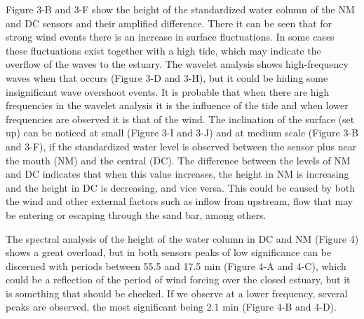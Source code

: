 \documentclass[tesis.tex]{subfiles}
\begin{document}
    
    Figure 3-B and 3-F show the height of the standardized water column of the NM and DC sensors and their amplified difference. There it can be seen that for strong wind events there is an increase in surface fluctuations. In some cases these fluctuations exist together with a high tide, which may indicate the overflow of the waves to the estuary. The wavelet analysis shows high-frequency waves when that occurs (Figure 3-D and 3-H), but it could be hiding some insignificant wave overshoot events. It is probable that when there are high frequencies in the wavelet analysis it is the influence of the tide and when lower frequencies are observed it is that of the wind.
    The inclination of the surface (set up) can be noticed at small (Figure 3-I and 3-J) and at medium scale (Figure 3-B and 3-F), if the standardized water level is observed between the sensor plus near the mouth (NM) and the central (DC). The difference between the levels of NM and DC indicates that when this value increases, the height in NM is increasing and the height in DC is decreasing, and vice versa. This could be caused by both the wind and other external factors such as inflow from upstream, flow that may be
    entering or escaping through the sand bar, among others.
    
    
    The spectral analysis of the height of the water column in DC and NM (Figure 4) shows a great overload, but in both sensors peaks of low significance can be discerned with periods between 55.5 and 17.5 min (Figure 4-A and 4-C), which could be a reflection of the period of wind forcing over the closed estuary, but it is something that should be checked. If we observe at a lower frequency, several peaks are observed, the most significant being 2.1 min (Figure 4-B and 4-D).
    
\end{document}
